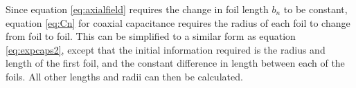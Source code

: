 Since equation \ref{eq:axialfield} requires the change in foil length $b_n$ to be constant, equation \ref{eq:Cn} for coaxial capacitance requires the radius of each foil to change from foil to foil.
This can be simplified to a similar form as equation \ref{eq:expcaps2}, except that the initial information required is the radius and length of the first foil, and the constant difference in length between each of the foils.
All other lengths and radii can then be calculated.








%





%




